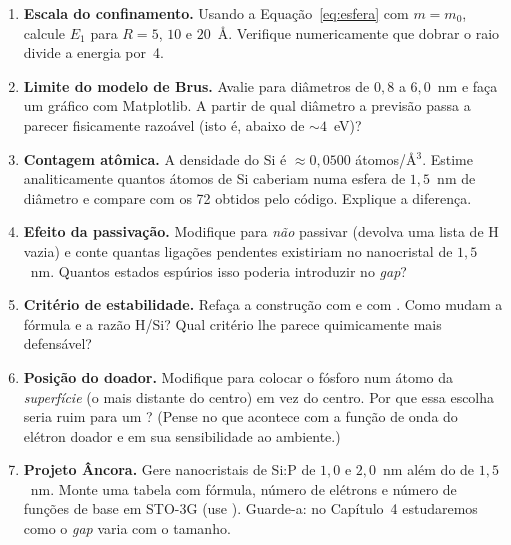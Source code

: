 \begin{enumerate}[leftmargin=*,label=\textbf{3.\arabic*}]
  \item \textbf{Escala do confinamento.} Usando a Equação~\ref{eq:esfera} com
        $m = m_0$, calcule $E_1$ para $R = 5$, $10$ e $20$~Å. Verifique
        numericamente que dobrar o raio divide a energia por~4.

  \item \textbf{Limite do modelo de Brus.} Avalie  para diâmetros de
        $0{,}8$ a $6{,}0$~nm e faça um gráfico com Matplotlib. A partir de qual
        diâmetro a previsão passa a parecer fisicamente razoável (isto é, abaixo
        de $\sim 4$~eV)?

  \item \textbf{Contagem atômica.} A densidade do Si é $\approx 0{,}0500$
        átomos/Å$^3$. Estime analiticamente quantos átomos de Si caberiam numa
        esfera de $1{,}5$~nm de diâmetro e compare com os 72 obtidos pelo código.
        Explique a diferença.

  \item \textbf{Efeito da passivação.} Modifique  para
        \emph{não} passivar (devolva uma lista de H vazia) e conte quantas ligações
        pendentes existiriam no nanocristal de $1{,}5$~nm. Quantos estados
        espúrios isso poderia introduzir no \emph{gap}?

  \item \textbf{Critério de estabilidade.} Refaça a construção com
         e com . Como mudam a fórmula e a razão
        H/Si? Qual critério lhe parece quimicamente mais defensável?

  \item \textbf{Posição do doador.} Modifique  para colocar o
        fósforo num átomo da \emph{superfície} (o mais distante do centro) em vez
        do centro. Por que essa escolha seria ruim para um \qubit{}? (Pense no que
        acontece com a função de onda do elétron doador e em sua sensibilidade ao
        ambiente.)

  \item \textbf{Projeto Âncora.} Gere nanocristais de Si:P de $1{,}0$ e
        $2{,}0$~nm além do de $1{,}5$~nm. Monte uma tabela com fórmula, número de
        elétrons e número de funções de base em STO-3G (use ).
        Guarde-a: no Capítulo~4 estudaremos como o \emph{gap} varia com o tamanho.
\end{enumerate}
